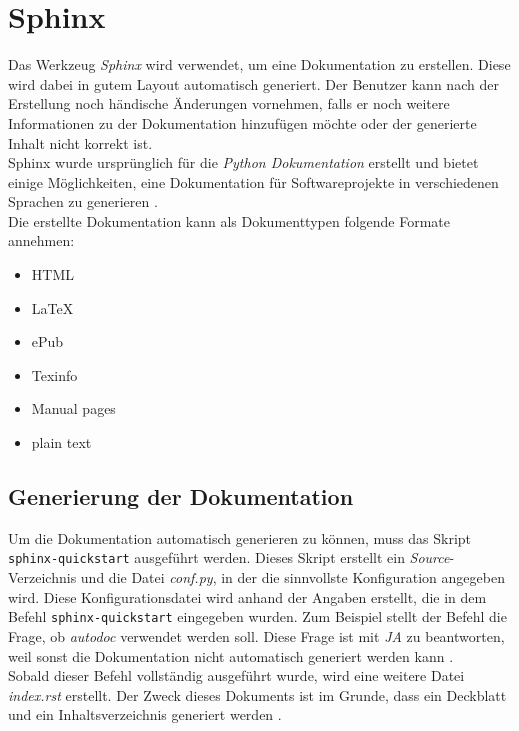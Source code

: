 \section{Sphinx}
\pra
\noindent
Das Werkzeug \textit{Sphinx} wird verwendet, um eine Dokumentation zu erstellen. Diese wird dabei in gutem Layout automatisch generiert. Der Benutzer kann nach der Erstellung noch händische Änderungen vornehmen, falls er noch weitere Informationen zu der Dokumentation hinzufügen möchte oder der generierte Inhalt nicht korrekt ist. 
\\

\noindent
Sphinx wurde ursprünglich für die \textit{Python Dokumentation} erstellt und bietet einige Möglichkeiten, eine Dokumentation für Softwareprojekte in verschiedenen Sprachen zu generieren . 
\\

\noindent
Die erstellte Dokumentation kann als Dokumenttypen folgende Formate annehmen\footnotemark[31]: 
\begin{itemize}
	\item{HTML}
	\item{LaTeX}
	\item{ePub}
	\item{Texinfo}
	\item{Manual pages}
	\item{plain text}
\end{itemize}

\subsection{Generierung der Dokumentation}\pra
\noindent
Um die Dokumentation automatisch generieren zu können, muss das Skript \verb|sphinx-quickstart| ausgeführt werden. Dieses Skript erstellt ein \textit{Source}-Verzeichnis und die Datei \textit{conf.py}, in der die sinnvollste Konfiguration angegeben wird. Diese Konfigurationsdatei wird anhand der Angaben erstellt, die in dem Befehl \verb|sphinx-quickstart| eingegeben wurden. Zum Beispiel stellt der Befehl die Frage, ob \textit{autodoc} verwendet werden soll. Diese Frage ist mit \textit{JA} zu beantworten, weil sonst die Dokumentation nicht automatisch generiert werden kann \footnotemark[31].
\\

\noindent
Sobald dieser Befehl vollständig ausgeführt wurde, wird eine weitere Datei \textit{index.rst} erstellt. Der Zweck dieses Dokuments ist im Grunde, dass ein Deckblatt und ein Inhaltsverzeichnis generiert werden \footnotemark[31].
\\

